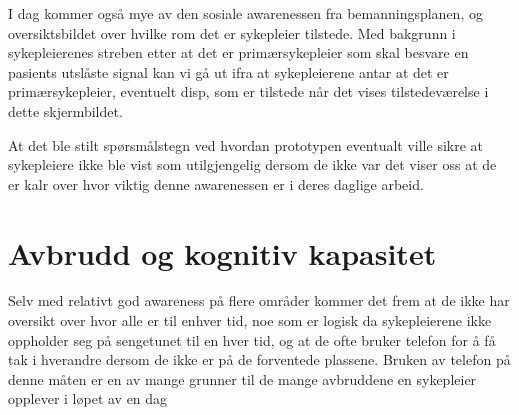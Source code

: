 \noindent
I dag kommer også mye av den sosiale awarenessen fra bemanningsplanen, og oversiktsbildet over hvilke rom det er sykepleier tilstede. Med bakgrunn i sykepleierenes streben etter at det er primærsykepleier som skal besvare en pasients utslåste signal kan vi gå ut ifra at sykepleierene antar at det er primærsykepleier, eventuelt disp, som er tilstede når det vises tilstedeværelse i dette skjermbildet. 

\noindent
At det ble stilt spørsmålstegn ved hvordan prototypen eventualt ville sikre at sykepleiere ikke ble vist som utilgjengelig dersom de ikke var det viser oss at de er kalr over hvor viktig denne awarenessen er i deres daglige arbeid. 


\section{Avbrudd og kognitiv kapasitet}
\noindent
Selv med relativt god awareness på flere områder kommer det frem at de ikke har oversikt over hvor alle er til enhver tid, noe som er logisk da sykepleierene ikke oppholder seg på sengetunet til en hver tid, og at de ofte bruker telefon for å få tak i hverandre dersom de ikke er på de forventede plassene. Bruken av telefon på denne måten er en av mange grunner til de mange avbruddene en sykepleier opplever i løpet av en dag 
